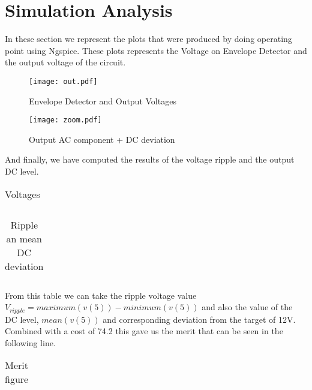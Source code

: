 \section{Simulation Analysis}
\label{sec:simulation} 

\par In these section we represent the plots that were produced by doing operating point using Ngspice. These plots represents the Voltage on Envelope Detector and the output voltage of the circuit.


\begin{figure} [!htb] 
  \texttt{[image: out.pdf]}
  \caption{Envelope Detector and Output Voltages}
  \label{fig:theoplots}
  \endminipage\hfill
\end{figure}



\begin{figure} [!htb]
  \texttt{[image: zoom.pdf]}
  \caption{Output AC component + DC deviation}
  \label{fig:theoplots}
  \endminipage\hfill
\end{figure}


\par And finally, we have computed the results of the voltage ripple and the output DC level.  

\FloatBarrier
\begin{table}[h]
  \centering
  \begin{tabular}{|c|c|c|}
    \hline    
    
    \hline
  \end{tabular}
  \caption{Voltages}
  \label{tab:Spice1}
\end{table}
\FloatBarrier  

\FloatBarrier
\begin{table}[h]
  \centering
  \begin{tabular}{|c|c|c|}
    \hline    
    
    \hline
  \end{tabular}
  \caption{Ripple an mean DC deviation}
  \label{tab:Spice2}
\end{table}
\FloatBarrier 

From this table we can take the ripple voltage value $V_{ripple}=maximum(v(5))-minimum(v(5))$ and also the value of the DC level, $mean(v(5))$ and corresponding deviation from the target of 12V.\\
Combined with a cost of 74.2 this gave us the merit that can be seen in the following line.


\FloatBarrier
\begin{table}[h]
  \centering
  \begin{tabular}{|c|c|c|}
    \hline    
    
    \hline
  \end{tabular}
  \caption{Merit figure}
  \label{tab:Spice2}
\end{table}
\FloatBarrier 
